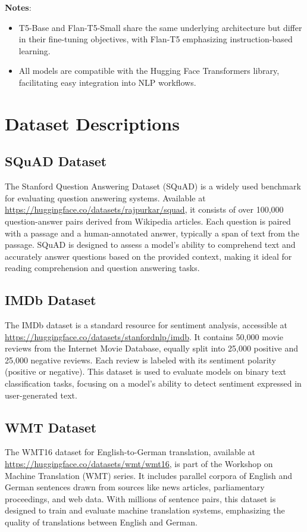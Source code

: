 \textbf{Notes}:
\begin{itemize}
    \item T5-Base and Flan-T5-Small share the same underlying architecture but differ in their fine-tuning objectives, with Flan-T5 emphasizing instruction-based learning.
    \item All models are compatible with the Hugging Face Transformers library, facilitating easy integration into NLP workflows.
\end{itemize}

\section{Dataset Descriptions}

\subsection{SQuAD Dataset}
The Stanford Question Answering Dataset (SQuAD) is a widely used benchmark for evaluating question answering systems. Available at \url{https://huggingface.co/datasets/rajpurkar/squad}, it consists of over 100,000 question-answer pairs derived from Wikipedia articles. Each question is paired with a passage and a human-annotated answer, typically a span of text from the passage. SQuAD is designed to assess a model's ability to comprehend text and accurately answer questions based on the provided context, making it ideal for reading comprehension and question answering tasks.

\subsection{IMDb Dataset}
The IMDb dataset is a standard resource for sentiment analysis, accessible at \url{https://huggingface.co/datasets/stanfordnlp/imdb}. It contains 50,000 movie reviews from the Internet Movie Database, equally split into 25,000 positive and 25,000 negative reviews. Each review is labeled with its sentiment polarity (positive or negative). This dataset is used to evaluate models on binary text classification tasks, focusing on a model's ability to detect sentiment expressed in user-generated text.

\subsection{WMT Dataset}
The WMT16 dataset for English-to-German translation, available at \url{https://huggingface.co/datasets/wmt/wmt16}, is part of the Workshop on Machine Translation (WMT) series. It includes parallel corpora of English and German sentences drawn from sources like news articles, parliamentary proceedings, and web data. With millions of sentence pairs, this dataset is designed to train and evaluate machine translation systems, emphasizing the quality of translations between English and German.

